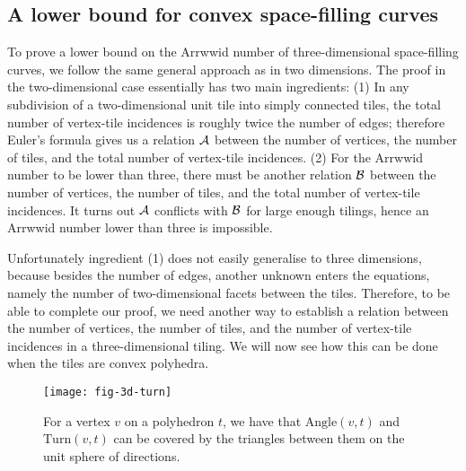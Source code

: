 \documentclass[11pt,a4paper]{article}
\newcommand{\Angl}{\mathrm{Angle}}
\newcommand{\Turn}{\mathrm{Turn}}
\begin{document}
\subsection{A lower bound for convex space-filling curves}

To prove a lower bound on the Arrwwid number of three-dimensional space-filling curves, we follow the same general approach as in two dimensions. The proof in the two-dimensional case essentially has two main ingredients: (1) In any subdivision of a two-dimensional unit tile into simply connected tiles, the total number of vertex-tile incidences is roughly twice the number of edges; therefore Euler's formula gives us a relation ${\cal A}$ between the number of vertices, the number of tiles, and the total number of vertex-tile incidences. (2) For the Arrwwid number to be lower than three, there must be another relation ${\cal B}$ between the number of vertices, the number of tiles, and the total number of vertex-tile incidences. It turns out ${\cal A}$ conflicts with ${\cal B}$ for large enough tilings, hence an Arrwwid number lower than three is impossible.

Unfortunately ingredient (1) does not easily generalise to three dimensions, because besides the number of edges, another unknown enters the equations, namely the number of two-dimensional facets between the tiles. Therefore, to be able to complete our proof, we need another way to establish a relation between the number of vertices, the number of tiles, and the number of vertex-tile incidences in a three-dimensional tiling. We will now see how this can be done when the tiles are convex polyhedra.

\begin{figure}
\centering
\texttt{[image: fig-3d-turn]}
\caption{For a vertex $v$ on a polyhedron $t$, we have that $\Angl(v,t)$ and $\Turn(v,t)$ can be covered by the triangles between them on the unit sphere of directions.}
\label{fig:3d-turn}
\end{figure}
\end{document}
